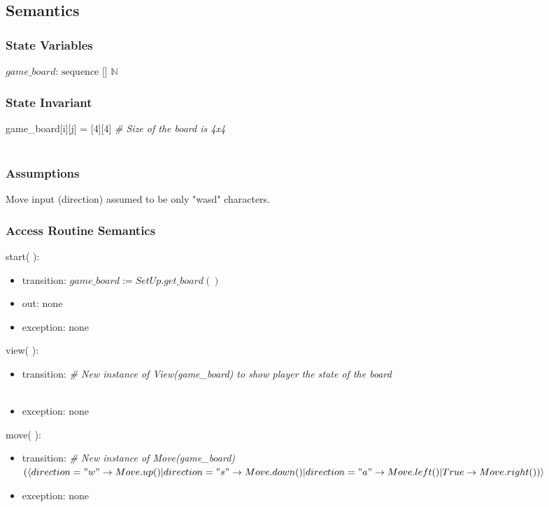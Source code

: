 \documentclass[12pt]{article}
\begin{document}
\subsection* {Semantics}

\subsubsection* {State Variables}

$\mathit{game\_board}$: $\text{sequence [] } \mathbb{N}$

\subsubsection* {State Invariant}

game_board[i][j] = [4][4]  \textit{\# Size of the board is 4x4}~\\\

\subsubsection* {Assumptions}

Move input (direction) assumed to be only "wasd" characters. 

\subsubsection* {Access Routine Semantics}

\noindent start( ):
\begin{itemize}
\item transition: $\mathit{game\_board} := \mathit{SetUp.get\_board()}$
\item out: none
\item exception: none
\end{itemize}

\noindent view( ):
\begin{itemize}
\item transition: \textit{\# New instance of View(game\_board) to show player the state of the board}~\\\
\item exception: none
\end{itemize}

\noindent move( ):
\begin{itemize}
\item transition: \textit{\# New instance of Move(game\_board)}~\\

$(\langle direction = "w" \rightarrow Move.up() | direction = "s" \rightarrow Move.down() | direction = "a" \rightarrow Move.left() | True \rightarrow Move.right()) \rangle$

\item exception: none
\end{itemize}
\end{document}
